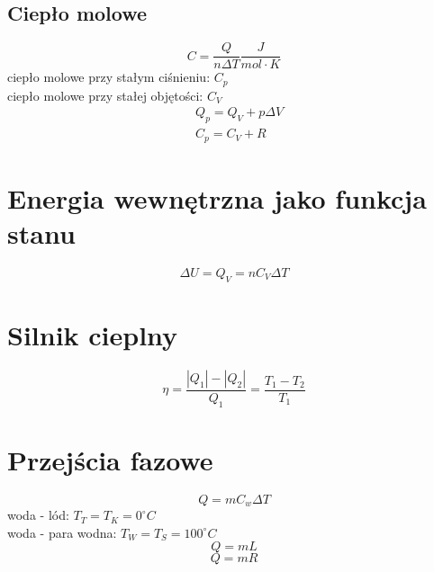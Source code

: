     \subsection{Ciepło molowe}
      \begin{equation}
        C = \frac{Q}{n\Delta T} \unit{\frac{J}{mol\cdot K}}
      \end{equation}
      ciepło molowe przy stałym ciśnieniu: $C_p$\\
      ciepło molowe przy stałej objętości: $C_V$
      \begin{align}
        &Q_p = Q_V + p\Delta V\\
        &C_p = C_V + R
      \end{align}
  \section{Energia wewnętrzna jako funkcja stanu}
    \begin{equation}
      \Delta U = Q_V = nC_V\Delta T
    \end{equation}
    \section{Silnik cieplny}
    \begin{equation}
      \eta = \frac{|Q_1|-|Q_2|}{Q_1} = \frac{T_1 - T_2}{T_1}
    \end{equation}
  \section{Przejścia fazowe}
    \begin{equation}
      Q = mC_w\Delta T
    \end{equation}
    woda - lód: $T_T = T_K = 0^\circ C$\\
    woda - para wodna: $T_W = T_S = 100^\circ C$
    \begin{equation}
      Q = mL
    \end{equation}
    \begin{equation}
      Q = mR
    \end{equation}
